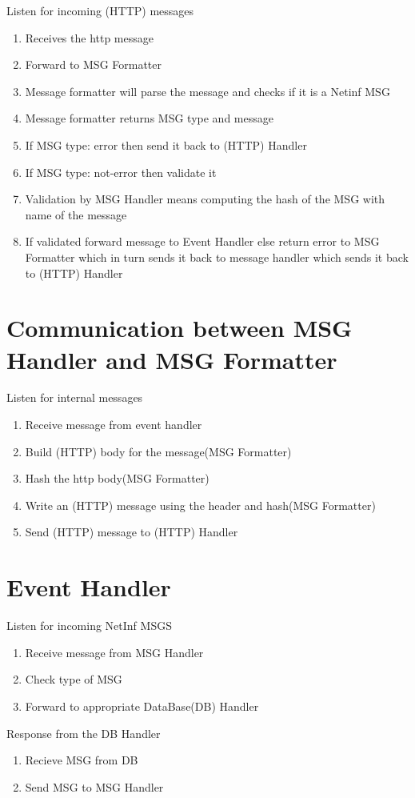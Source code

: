\documentclass[11pt]{report}
\begin{document}
Listen for incoming (HTTP) messages
\begin{enumerate}
\item Receives the http message
\item Forward to MSG Formatter
\item Message formatter will parse the message and checks if it is a Netinf MSG
\item Message formatter returns MSG type and message
\item If MSG type: error then send it back to (HTTP) Handler
\item If MSG type: not-error then validate it
\item Validation by MSG Handler means computing the hash of the MSG with name of the message
\item If validated forward message to Event Handler else return error to MSG Formatter which in turn sends it back to message handler which sends it back to (HTTP) Handler
\end{enumerate}

\section{Communication between MSG Handler and MSG Formatter}
Listen for internal messages
\begin{enumerate}
\item Receive message from event handler
\item Build (HTTP) body for the message(MSG Formatter)
\item Hash the http body(MSG Formatter)
\item Write an (HTTP) message using the header and hash(MSG Formatter)
\item Send (HTTP) message to (HTTP) Handler
\end{enumerate}

\section {Event Handler}
Listen for incoming NetInf MSGS
\begin{enumerate}
\item Receive message from MSG Handler
\item Check type of MSG
\item Forward to appropriate DataBase(DB) Handler
\end{enumerate}
Response from the DB Handler
\begin{enumerate}
\item Recieve MSG from DB 
\item Send MSG to MSG Handler
\end{enumerate}
\end{document}
